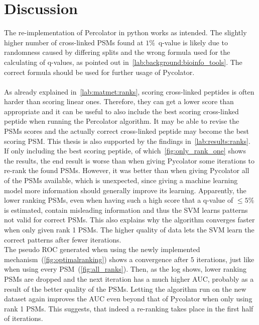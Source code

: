 
\chapter{Discussion}
\label{discussion}
The re-implementation of Percolator in python works as intended. %
The slightly higher number of cross-linked PSMs found at $1\%$~q-value is likely due to randomness caused by differing splits and the wrong formula used for the calculating of q-values, as pointed out in~\ref{lab:background:bioinfo_tools}. The correct formula should be used for further usage of Pycolator.\\\\
As already explained in~\ref{lab:matmet:ranks}, scoring cross-linked peptides is often harder than scoring linear ones. Therefore, they can get a lower score than appropriate and it can be useful to also include the best scoring cross-linked peptide when running the Percolator algorithm. It may be able to revise the PSMs scores and the actually correct cross-linked peptide may become the best scoring PSM. This thesis is also supported by the findings in~\ref{lab:results:ranks}. If only including the best scoring peptide, of which~\ref{fig:only_rank_one} shows the results, the end result is worse than when giving Pycolator some iterations to re-rank the found PSMs. However, it was better than when giving Pycolator all of the PSMs available, which is unexpected, since giving a machine learning model more information should generally improve its learning. Apparently, the lower ranking PSMs, even when having such a high score that a q-value of $\leq5\%$ is estimated, contain misleading information and thus the SVM learns patterns not valid for correct PSMs. This also explains why the algorithm converges faster when only given rank 1 PSMs. The higher quality of data lets the SVM learn the correct patterns after fewer iterations. \\
The pseudo ROC generated when using the newly implemented mechanism~(\ref{fig:optimalranking}) shows a convergence after $5$ iterations, just like when using every PSM~(\ref{fig:all_ranks}). Then, as the log shows, lower ranking PSMs are dropped and the next iteration has a much higher AUC, probably as a result of the better quality of the PSMs. Letting the algorithm run on the new dataset again improves the AUC even beyond that of Pycolator when only using rank 1 PSMs. This suggests, that indeed a re-ranking takes place in the first half of iterations.\\
